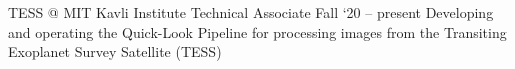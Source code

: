 \experience
    {TESS @ MIT Kavli Institute}
    {Technical Associate}
    {Fall `20 -- present}
    {
        Developing and operating the  Quick-Look Pipeline for processing images from the Transiting
        Exoplanet Survey Satellite (TESS)
    }
